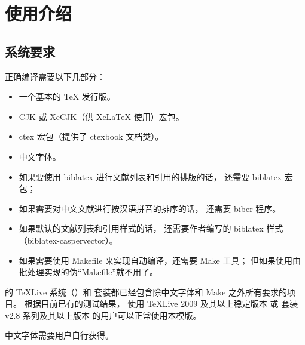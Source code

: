 %

\chapter{使用介绍}
	\section{系统要求}\label{sec:req}

	正确编译需要以下几部分：
	\begin{itemize}
		\item 一个基本的 \TeX{} 发行版。
		\item CJK 或 XeCJK（供 Xe\LaTeX{} 使用）宏包。
		\item ctex 宏包\supercite{ctex,ctex-faq}（提供了 ctexbook 文档类）。
		\item 中文字体。
		\item 如果要使用 biblatex 进行文献列表和引用的排版的话，
			还需要 biblatex 宏包\supercite{biblatex}；
		\item 如果需要对中文文献进行按汉语拼音的排序的话，
			还需要 biber 程序\supercite{biber}。
		\item 如果默认的文献列表和引用样式的话，
			还需要作者编写的 biblatex 样式
			（biblatex-caspervector）\supercite{biblatex-caspervector}。
		\item 如果需要使用 Makefile 来实现自动编译，还需要 Make 工具；
			但如果使用由批处理实现的伪“Makefile”就不用了。
	\end{itemize}

	的 \TeX{}Live 系统（）和 \CTeX{} 套装都已经包含除中文字体和 Make 之外所有要求的项目。%
	根据目前已有的测试结果，
	使用 \TeX{}Live 2009 及其以上稳定版本%
	或 \CTeX{} 套装 v2.8 系列及其以上版本
	的用户可以正常使用本模版。

	中文字体需要用户自行获得。

